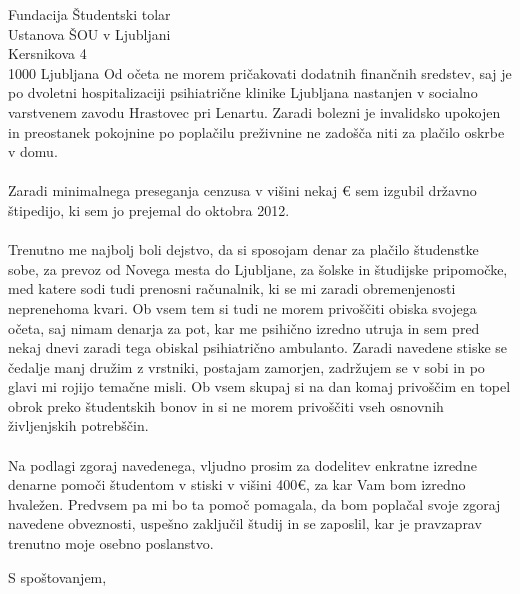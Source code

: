 \documentclass[a4paper]{scrlttr2}
\begin{document}
\begin{letter}{Fundacija Študentski tolar \\ Ustanova ŠOU v Ljubljani \\ Kersnikova 4 \\ 1000 Ljubljana}
\pagebreak
Od očeta ne morem pričakovati dodatnih finančnih sredstev, saj je po dvoletni hospitalizaciji psihiatrične klinike Ljubljana nastanjen v socialno varstvenem zavodu Hrastovec pri Lenartu. Zaradi bolezni je invalidsko upokojen in preostanek pokojnine po poplačilu preživnine ne zadošča niti za plačilo oskrbe v domu. 
\\
\\
Zaradi minimalnega preseganja cenzusa v višini nekaj \euro \hspace{1pt} sem izgubil državno štipedijo, ki sem jo prejemal do oktobra 2012. 
\\
\\
Trenutno me najbolj boli dejstvo, da si sposojam denar za plačilo študenstke sobe, za prevoz od Novega mesta do Ljubljane, za šolske in študijske pripomočke, med katere sodi tudi prenosni računalnik, ki se mi zaradi obremenjenosti neprenehoma kvari. Ob vsem tem si tudi ne morem privoščiti obiska svojega očeta, saj nimam denarja za pot, kar me psihično izredno utruja in sem pred nekaj dnevi zaradi tega obiskal psihiatrično ambulanto. Zaradi navedene stiske se čedalje manj družim z vrstniki, postajam zamorjen, zadržujem se v sobi in po glavi mi rojijo temačne misli. Ob vsem skupaj si na dan komaj privoščim en topel obrok preko študentskih bonov in si ne morem privoščiti vseh osnovnih življenjskih potrebščin. 
\\
\\
Na podlagi zgoraj navedenega, vljudno prosim za dodelitev enkratne izredne denarne pomoči študentom v stiski v višini 400\euro, za kar Vam bom izredno hvaležen. Predvsem pa mi bo ta pomoč pomagala, da bom poplačal svoje zgoraj navedene obveznosti, uspešno zaključil študij in se zaposlil, kar je pravzaprav trenutno moje osebno poslanstvo.

\closing{S spoštovanjem,}

\vspace{5mm}





 
\end{letter}
 
\end{document}
